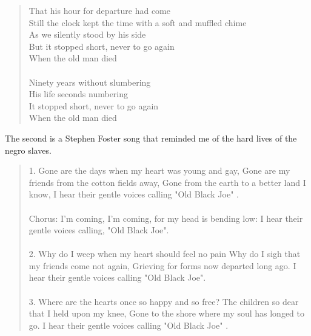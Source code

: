 \begin{quotation}
That his hour for departure had come \\
Still the clock kept the time with a soft and muffled chime \\
As we silently stood by his side \\
But it stopped short, never to go again \\
When the old man died \\ \\
Ninety years without slumbering \\
His life seconds numbering \\
It stopped short, never to go again \\
When the old man died
\end{quotation}

The second is a Stephen Foster song that reminded me of the hard lives of the negro slaves.
\begin{quotation}
1. Gone are the days when my heart was young and gay, Gone are my friends from the cotton fields away, Gone from the earth to a better land I know, I hear their gentle voices calling "Old Black Joe" . \\ \\
Chorus: I'm coming, I'm coming, for my head is bending low: I hear their gentle voices calling, "Old Black Joe". \\\\
2. Why do I weep when my heart should feel no pain Why do I sigh that my friends come not again, Grieving for forms now departed long ago. I hear their gentle voices calling "Old Black Joe". \\ \\
3. Where are the hearts once so happy and so free? The children so dear that I held upon my knee, Gone to the shore where my soul has longed to go. I hear their gentle voices calling "Old Black Joe" .
\end{quotation}

